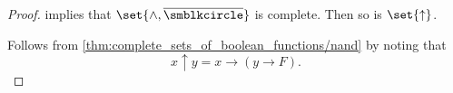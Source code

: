 \begin{proof}
   implies that \( \set{ \wedge, \oline{\anon} } \) is complete. Then so is \( \set{ \uparrow } \).

   Follows from \cref{thm:complete_sets_of_boolean_functions/nand} by noting that
  \begin{equation*}
    x \uparrow y = x \rightarrow (y \rightarrow F).
  \end{equation*}
\end{proof}
